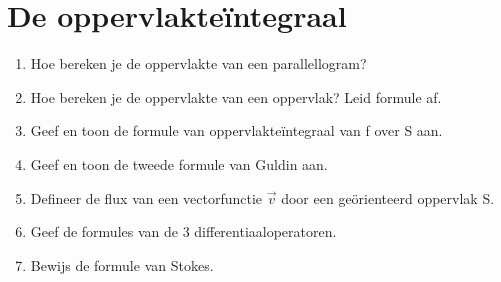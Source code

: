 \documentclass[12pt]{article}
\begin{document}
    \maketitle

    \section{De oppervlakte\"integraal}
    \begin{enumerate}
        \item Hoe bereken je de oppervlakte van een parallellogram?
        \item Hoe bereken je de oppervlakte van een oppervlak? Leid formule af.
        \item Geef en toon de formule van oppervlakteïntegraal van f over S aan.
        \item Geef en toon de tweede formule van Guldin aan.
        \item Defineer de flux van een vectorfunctie $\vec{v}$ door een geörienteerd oppervlak S.
        \item Geef de formules van de 3 differentiaaloperatoren.
        \item Bewijs de formule van Stokes.
    \end{enumerate}
    
\end{document}
